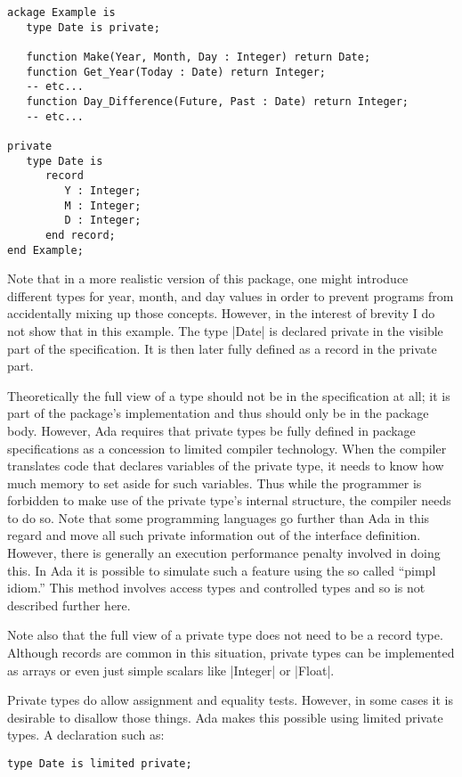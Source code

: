 \begin{lstlisting}
ackage Example is
   type Date is private;

   function Make(Year, Month, Day : Integer) return Date;
   function Get_Year(Today : Date) return Integer;
   -- etc...
   function Day_Difference(Future, Past : Date) return Integer;
   -- etc...

private
   type Date is
      record
         Y : Integer;
         M : Integer;
         D : Integer;
      end record;
end Example;
\end{lstlisting}

Note that in a more realistic version of this package, one might introduce different types for
year, month, and day values in order to prevent programs from accidentally mixing up those
concepts. However, in the interest of brevity I do not show that in this example. The type
|Date| is declared private in the visible part of the specification. It is then later fully
defined as a record in the private part.

Theoretically the full view of a type should not be in the specification at all; it is part of
the package's implementation and thus should only be in the package body. However, Ada requires
that private types be fully defined in package specifications as a concession to limited
compiler technology. When the compiler translates code that declares variables of the private
type, it needs to know how much memory to set aside for such variables. Thus while the
programmer is forbidden to make use of the private type's internal structure, the compiler needs
to do so. Note that some programming languages go further than Ada in this regard and move all
such private information out of the interface definition. However, there is generally an
execution performance penalty involved in doing this. In Ada it is possible to simulate such a
feature using the so called ``pimpl idiom.'' This method involves access types and controlled
types and so is not described further here.

Note also that the full view of a private type does not need to be a record type. Although
records are common in this situation, private types can be implemented as arrays or even just
simple scalars like |Integer| or |Float|.

Private types do allow assignment and equality tests. However, in some cases it is desirable to
disallow those things. Ada makes this possible using limited private types. A declaration such
as:

\begin{lstlisting}
type Date is limited private;
\end{lstlisting}

